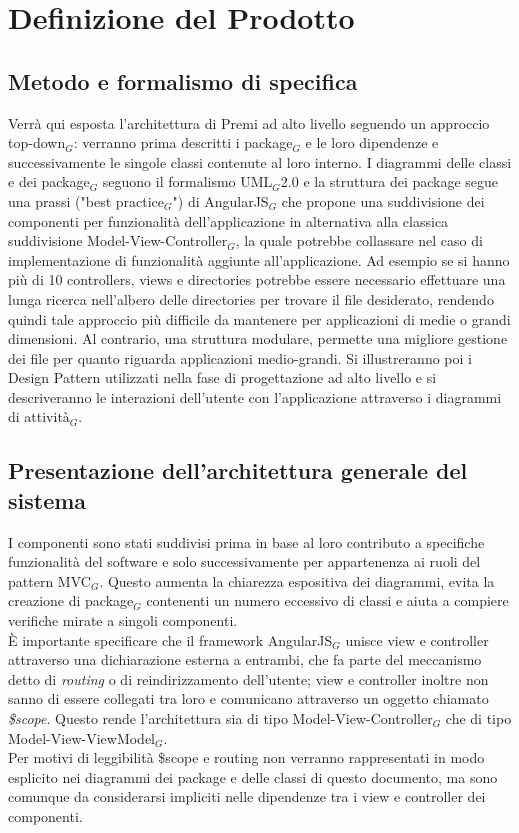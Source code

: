 \newpage
\section{Definizione del Prodotto}

\subsection{Metodo e formalismo di specifica}
Verrà qui esposta l'architettura di Premi ad alto livello seguendo un approccio top-down$_G$: verranno prima descritti i package$_G$ e le loro dipendenze e successivamente le singole classi contenute al loro interno. I diagrammi delle classi e dei package$_G$ seguono il formalismo UML$_G$2.0 e la struttura dei package segue una prassi ("best practice$_G$") di AngularJS$_G$ che propone una suddivisione dei componenti per funzionalità dell'applicazione in alternativa alla classica suddivisione Model-View-Controller$_G$, la quale potrebbe collassare nel caso di implementazione di funzionalità aggiunte all'applicazione. Ad esempio se si hanno più di 10 controllers, views e directories potrebbe essere necessario effettuare una lunga ricerca nell'albero delle directories per trovare il file desiderato, rendendo quindi tale approccio più difficile da mantenere per applicazioni di medie o grandi dimensioni. Al contrario, una struttura modulare, permette una migliore gestione dei file per quanto riguarda applicazioni medio-grandi.
Si illustreranno poi i Design Pattern utilizzati nella fase di progettazione ad alto livello e si descriveranno le interazioni dell'utente con l'applicazione attraverso i diagrammi di attività$_G$.


\subsection{Presentazione dell'architettura generale del sistema}

I componenti sono stati suddivisi prima in base al loro contributo a specifiche funzionalità del software e solo successivamente per appartenenza ai ruoli del pattern MVC$_G$. Questo aumenta la chiarezza espositiva dei diagrammi, evita la creazione di package$_G$ contenenti un numero eccessivo di classi e aiuta a compiere verifiche mirate a singoli componenti. \\
È importante specificare che il framework AngularJS$_G$ unisce view e controller attraverso una dichiarazione esterna a entrambi, che fa parte del meccanismo detto di \textit{routing} o di reindirizzamento dell'utente; view e controller inoltre non sanno di essere collegati tra loro e comunicano attraverso un oggetto chiamato \textit{\$scope}. Questo rende l'architettura sia di tipo Model-View-Controller$_G$ che di tipo Model-View-ViewModel$_G$. \\
Per motivi di leggibilità \$scope e routing non verranno rappresentati in modo esplicito nei diagrammi dei package e delle classi di questo documento, ma sono comunque da considerarsi impliciti nelle dipendenze tra i view e controller dei componenti. \\

